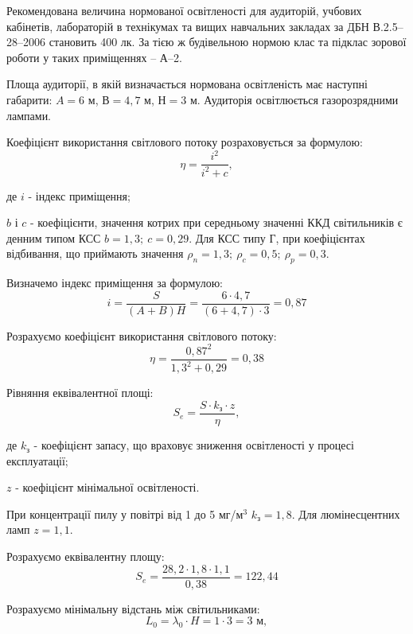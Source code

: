 \documentclass[a4paper,ukrainian,utf8,nocolumnsxix,floatsection,equationsection]{eskdtext}
\begin{document}
Рекомендована величина нормованої освітленості для аудиторій, учбових кабінетів, лабораторій в технікумах та вищих навчальних закладах за ДБН В.2.5–28–2006 становить 400 лк. За тією ж будівельною нормою клас та підклас зорової роботи у таких приміщеннях – А–2.

Площа аудиторії, в якій визначається нормована освітленість має наступні габарити: $A = 6$ м, $В = 4,7$ м, $Н = 3$ м. Аудиторія освітлюється газорозрядними лампами.

Коефіцієнт використання світлового потоку розраховується за формулою:
\begin{equation}
	\eta = \frac{i^2}{i^2 + c},
\end{equation}

де $i$ - індекс приміщення;

$b$ і $c$ - коефіцієнти, значення котрих при середньому значенні ККД світильників є денним типом КСС $b=1,3;\:c = 0,29$. Для КСС типу Г, при коефіцієнтах відбивання, що приймають значення $\rho_n = 1,3;\: \rho_c=0,5;\: \rho_p=0,3$.

Визначемо індекс приміщення за формулою:
\begin{equation}
	i = \frac{S}{(A + B)H} = \frac{6 \cdot 4,7}{(6 + 4,7) \cdot 3} = 0,87
\end{equation}

Розрахуємо коефіцієнт використання світлового потоку:
\begin{equation}
	\eta = \frac{0,87^2}{1,3^2 + 0,29} = 0,38
\end{equation}

Рівняння еквівалентної площі:
\begin{equation}
	S_e = \frac{S \cdot k_\text{з} \cdot z}{\eta},
\end{equation}

де $k_\text{з}$ - коефіцієнт запасу, що враховує зниження освітленості у процесі експлуатації;

$z$ - коефіцієнт мінімальної освітленості.


При концентрації пилу у повітрі від 1 до 5 мг/м$^3$ $k_\text{з} = 1,8$. Для люмінесцентних ламп $z = 1,1$.

Розрахуємо еквівалентну площу:
\begin{equation}
	S_e = \frac{28,2 \cdot 1,8 \cdot 1,1}{0,38} = 122,44
\end{equation}

Розрахуємо мінімальну відстань між світильниками:
\begin{equation}
	L_0 = \lambda_0 \cdot H = 1 \cdot 3 = 3\text{ м},
\end{equation}
\end{document}
